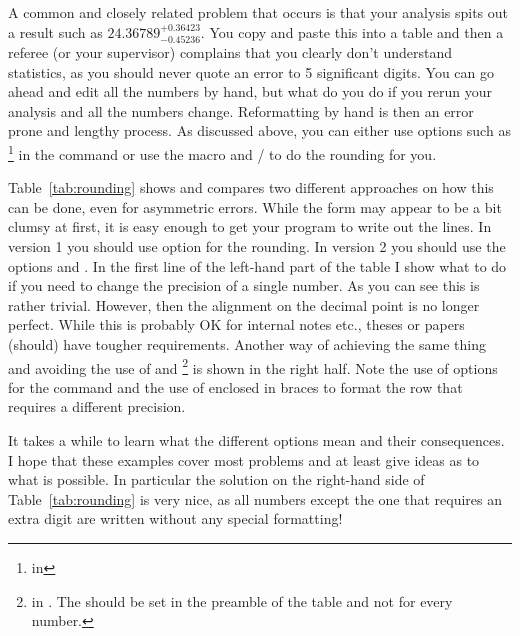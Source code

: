 A common and closely related problem that occurs is that your analysis
spits out a result such as $24.36789^{+0.36423}_{-0.45236}$. You copy
and paste this into a table and then a referee (or your supervisor)
complains that you clearly don't understand statistics, as you should
never quote an error to 5 significant digits. You can go ahead and
edit all the numbers by hand, but what do you do if you rerun your
analysis and all the numbers change. Reformatting by hand is then an
error prone and lengthy process. As discussed above, you can either
use options such as \footnote{ in
  } in the  command or use the macro
 and / to do the
rounding for you.

Table~\ref{tab:rounding} shows and compares two different approaches
on how this can be done, even for asymmetric errors. While the form
may appear to be a bit clumsy at first, it is easy enough to get your
program to write out the lines. In  version 1 you
should use option  for the rounding. In version 2 you
should use the options  and
. In the first line of the left-hand part of
the table I show what to do if you need to change the precision of a
single number.  As you can see this is rather trivial. However, then
the alignment on the decimal point is no longer perfect. While this is
probably OK for internal notes etc., theses or papers (should) have
tougher requirements. Another way of achieving the same thing and
avoiding the use of  and
\footnote{ in . The
   should be set in the preamble of the table and
  not for every number.} is shown in the right half. Note the use of
options for the  command and the use of  enclosed
in braces to format the row that requires a different precision.

It takes a while to learn what the different options mean and their
consequences. I hope that these examples cover most problems and at
least give ideas as to what is possible.  In particular the solution
on the right-hand side of Table~\ref{tab:rounding} is very nice, as
all numbers except the one that requires an extra digit are written
without any special formatting!

